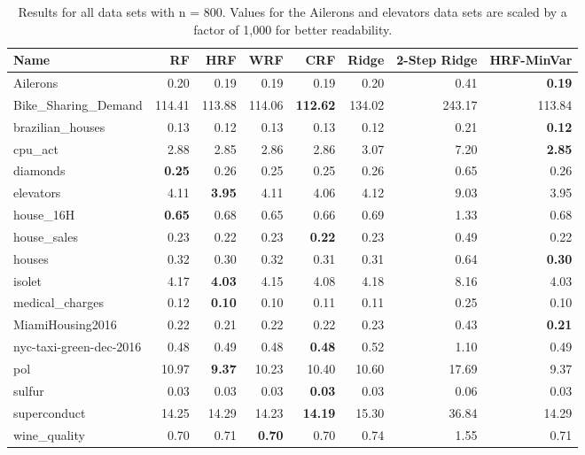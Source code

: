\begin{table}[ht]
\centering
\begingroup\scriptsize
\begin{tabular}{lrrrrrrr}
  \hline
\textbf{ Name } & \textbf{ RF } & \textbf{ HRF } & \textbf{ WRF } & \textbf{ CRF } & \textbf{ Ridge } & \textbf{ 2-Step Ridge } & \textbf{ HRF-MinVar } \\ 
  \hline
Ailerons & 0.20 & 0.19 & 0.19 & 0.19 & 0.20 & 0.41 & \textbf{0.19} \\ 
  Bike\_Sharing\_Demand & 114.41 & 113.88 & 114.06 & \textbf{112.62} & 134.02 & 243.17 & 113.84 \\ 
  brazilian\_houses & 0.13 & 0.12 & 0.13 & 0.13 & 0.12 & 0.21 & \textbf{0.12} \\ 
  cpu\_act & 2.88 & 2.85 & 2.86 & 2.86 & 3.07 & 7.20 & \textbf{2.85} \\ 
  diamonds & \textbf{0.25} & 0.26 & 0.25 & 0.25 & 0.26 & 0.65 & 0.26 \\ 
  elevators & 4.11 & \textbf{3.95} & 4.11 & 4.06 & 4.12 & 9.03 & 3.95 \\ 
  house\_16H & \textbf{0.65} & 0.68 & 0.65 & 0.66 & 0.69 & 1.33 & 0.68 \\ 
  house\_sales & 0.23 & 0.22 & 0.23 & \textbf{0.22} & 0.23 & 0.49 & 0.22 \\ 
  houses & 0.32 & 0.30 & 0.32 & 0.31 & 0.31 & 0.64 & \textbf{0.30} \\ 
  isolet & 4.17 & \textbf{4.03} & 4.15 & 4.08 & 4.18 & 8.16 & 4.03 \\ 
  medical\_charges & 0.12 & \textbf{0.10} & 0.10 & 0.11 & 0.11 & 0.25 & 0.10 \\ 
  MiamiHousing2016 & 0.22 & 0.21 & 0.22 & 0.22 & 0.23 & 0.43 & \textbf{0.21} \\ 
  nyc-taxi-green-dec-2016 & 0.48 & 0.49 & 0.48 & \textbf{0.48} & 0.52 & 1.10 & 0.49 \\ 
  pol & 10.97 & \textbf{9.37} & 10.23 & 10.40 & 10.60 & 17.69 & 9.37 \\ 
  sulfur & 0.03 & 0.03 & 0.03 & \textbf{0.03} & 0.03 & 0.06 & 0.03 \\ 
  superconduct & 14.25 & 14.29 & 14.23 & \textbf{14.19} & 15.30 & 36.84 & 14.29 \\ 
  wine\_quality & 0.70 & 0.71 & \textbf{0.70} & 0.70 & 0.74 & 1.55 & 0.71 \\ 
   \hline
\end{tabular}
\endgroup
\caption{Results for all data sets with n = 800. Values for the Ailerons and elevators data sets are scaled by a factor of 1,000 for better readability.} 
\end{table}

